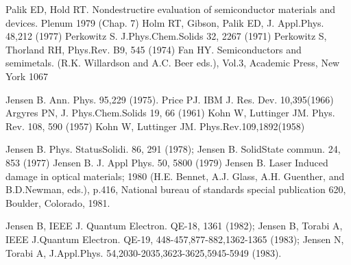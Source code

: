 \begin{thebibliography}{9}
       Palik ED, Hold RT.
       Nondestructire evaluation of semiconductor materials and devices.
       Plenum 1979 (Chap. 7) 
         Holm RT, Gibson, Palik ED, 
         J. Appl.Phys. 48,212 (1977)
         Perkowitz S. J.Phys.Chem.Solids 32, 2267 (1971)
         Perkowitz S, Thorland RH, Phys.Rev. B9, 545 (1974)
         Fan HY.
         Semiconductors and semimetals.
         (R.K. Willardson and A.C. Beer eds.),
         Vol.3, Academic Press, New York 1067

         Jensen B. Ann. Phys. 95,229 (1975).
         Price PJ. IBM J. Res. Dev. 10,395(1966)
         Argyres PN, J. Phys.Chem.Solids 19, 66 (1961)
         Kohn W, Luttinger JM.
         Phys. Rev. 108, 590 (1957)
         Kohn W, Luttinger JM.
         Phys.Rev.109,1892(1958)

         Jensen B. Phys. StatusSolidi. 86, 291 (1978);
         Jensen B. SolidState commun. 24, 853 (1977)
         Jensen B. J. Appl Phys. 50, 5800 (1979)
         Jensen B.
         Laser Induced damage in optical materials; 1980 (H.E. Bennet, A.J. Glass, A.H. Guenther,
         and B.D.Newman, eds.), p.416, National bureau of standards special
         publication 620, Boulder, Colorado, 1981.

         Jensen B, IEEE J. 
         Quantum Electron. QE-18, 1361 (1982); 
         Jensen B, Torabi A, IEEE J.Quantum Electron. QE-19, 448-457,877-882,1362-1365 (1983);
         Jensen N, Torabi A, J.Appl.Phys. 54,2030-2035,3623-3625,5945-5949 (1983).
\end{thebibliography}





